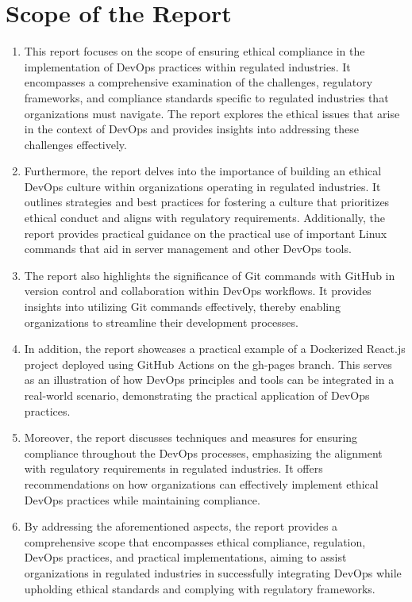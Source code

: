 \chapter{Scope of the Report}

\begin{enumerate}
    \item This report focuses on the scope of ensuring ethical compliance in the implementation of DevOps practices within regulated industries. It encompasses a comprehensive examination of the challenges, regulatory frameworks, and compliance standards specific to regulated industries that organizations must navigate. The report explores the ethical issues that arise in the context of DevOps and provides insights into addressing these challenges effectively.

    \item Furthermore, the report delves into the importance of building an ethical DevOps culture within organizations operating in regulated industries. It outlines strategies and best practices for fostering a culture that prioritizes ethical conduct and aligns with regulatory requirements. Additionally, the report provides practical guidance on the practical use of important Linux commands that aid in server management and other DevOps tools.

    \item The report also highlights the significance of Git commands with GitHub in version control and collaboration within DevOps workflows. It provides insights into utilizing Git commands effectively, thereby enabling organizations to streamline their development processes.

    \item In addition, the report showcases a practical example of a Dockerized React.js project deployed using GitHub Actions on the gh-pages branch. This serves as an illustration of how DevOps principles and tools can be integrated in a real-world scenario, demonstrating the practical application of DevOps practices.

    \item Moreover, the report discusses techniques and measures for ensuring compliance throughout the DevOps processes, emphasizing the alignment with regulatory requirements in regulated industries. It offers recommendations on how organizations can effectively implement ethical DevOps practices while maintaining compliance.

    \item By addressing the aforementioned aspects, the report provides a comprehensive scope that encompasses ethical compliance, regulation, DevOps practices, and practical implementations, aiming to assist organizations in regulated industries in successfully integrating DevOps while upholding ethical standards and complying with regulatory frameworks.
\end{enumerate}